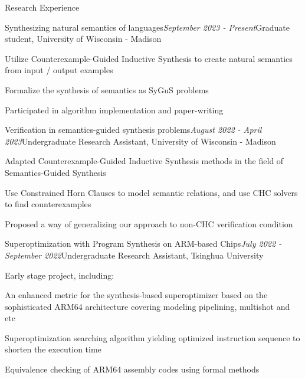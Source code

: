 \documentclass{resume} %
\newcommand{\Apr}{April }
\newcommand{\Jul}{July }
\newcommand{\Aug}{August }
\newcommand{\Sept}{September }
\begin{document}
\begin{rSection}{Research Experience}

\begin{rSubsection}{Synthesizing natural semantics of languages}{\em \Sept 2023 - Present}{Graduate student, \textup{University of Wisconsin - Madison}}{}

\item Utilize Counterexample-Guided Inductive Synthesis to create natural semantics from input / output examples
\item Formalize the synthesis of semantics as SyGuS problems
\item Participated in algorithm implementation and paper-writing

\end{rSubsection}

\begin{rSubsection}{Verification in semantics-guided synthesis problems}{\em \Aug 2022 - \Apr 2023}{Undergraduate Research Assistant, \textup{University of Wisconsin - Madison}}{}

\item Adapted Counterexample-Guided Inductive Synthesis methods in the field of Semantics-Guided Synthesis
\item Use Constrained Horn Clauses to model semantic relations, and use CHC solvers to find counterexamples
\item Proposed a way of generalizing our approach to non-CHC verification condition

\end{rSubsection}
  
\begin{rSubsection}{Superoptimization with Program Synthesis on ARM-based Chips}{\em \Jul 2022 - \Sept 2022}{Undergraduate Research Assistant, \textup{Tsinghua University}}{}
    
\item Early stage project, including: 
\item An enhanced metric for the synthesis-based superoptimizer based on the sophisticated ARM64 architecture covering modeling pipelining, multishot and etc
\item Superoptimization searching algorithm yielding optimized instruction sequence to shorten the execution time
\item Equivalence checking of ARM64 assembly codes using formal methods

\end{rSubsection}




\end{rSection}
\end{document}
